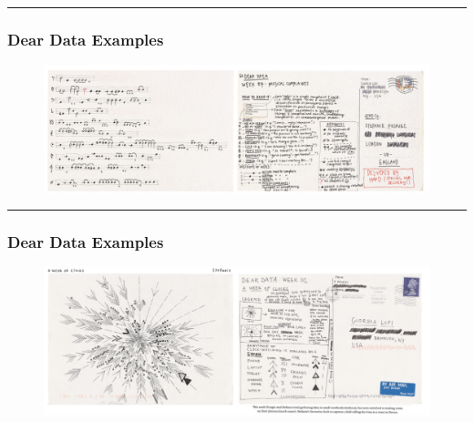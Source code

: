 \documentclass[
  letterpaper,
  DIV=11,
  numbers=noendperiod]{scrartcl}
\begin{document}
\begin{center}\rule{0.5\linewidth}{0.5pt}\end{center}

\hypertarget{dear-data-examples}{%
\subsubsection{Dear Data Examples}\label{dear-data-examples}}

\begin{figure}

{\centering \includegraphics[width=1\textwidth,height=\textheight]{img/complaints.png}

}

\end{figure}

\begin{center}\rule{0.5\linewidth}{0.5pt}\end{center}

\hypertarget{dear-data-examples-1}{%
\subsubsection{Dear Data Examples}\label{dear-data-examples-1}}

\begin{figure}

{\centering \includegraphics[width=1\textwidth,height=\textheight]{img/time.png}

}

\end{figure}
\end{document}
